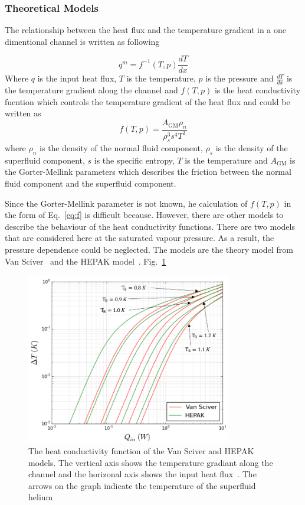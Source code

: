 \subsubsection{Theoretical Models}
The relationship between the heat flux and the temperature gradient in
a one dimentional channel is written as following

\begin{equation}
  \label{eq:q_dT}
  q^m = f^{-1}\left(T, p \right) \frac{dT}{dx}
\end{equation}
Where $q$ is the input heat flux, $T$ is the temperature, $p$ is the
pressure and $\frac{dT}{dx}$ is the temperature gradient along the
channel and $f\left(T, p \right)$ is the heat conductivity fucntion
which controls the temperature gradient of the heat flux and could be
written as
\begin{equation}
  \label{eq:f}
f \left( T, p \right) = \frac{A_\mathrm{GM}\rho_n}{\rho_s^{3}s^4T^3}
\end{equation}
where $\rho_n$ is the density of the normal fluid component, $\rho_s$
is the density of the superfluid component, $s$ is the specific
entropy, $T$ is the temperature and $A_\mathrm{GM}$ is the
Gorter-Mellink parameters which describes the friction between the
normal fluid component and the superfluid component.

Since the Gorter-Mellink parameter is not known, he calculation of
$f \left( T, p \right)$ in the form of Eq.~\ref{eq:f} is difficult
because. However, there are other models to describe the behaviour of
the heat conductivity functions. There are two models that are
considered here at the saturated vapour pressure. As a result, the
pressure dependence could be neglected. The models are the theory
model from Van Sciver~\cite{van2012helium} and the HEPAK
model~\cite{arp2005hepak}. Fig.~\ref{fig:VanSciver_vs_HEPAK}

\begin{figure}[h!]
  \centering \includegraphics[width=0.8\textwidth]{VanSciver_vs_HEPAK.png}
  \caption{The heat conductivity function of the Van Sciver and HEPAK
    models. The vertical axis shows the temperature gradiant along the
    channel and the horizonal axis shows the input heat
    flux~\cite{Florian_thesis}. The arrows on the graph indicate the
    temperature of the superfluid helium}
\label{fig:VanSciver_vs_HEPAK}
\end{figure}

